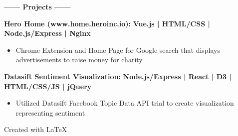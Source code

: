 \documentclass[12pt]{article}
\begin{document}
\colorbox{secondary}{
    \parbox{45em}{
    \color{white}
    \begin{center}
    \textbf{\Large------ Projects ------}\\
    \end{center}
    \begin{footnotesize}

    \textbf{\color{primary}\large Hero Home (www.home.heroinc.io):} \hfill \textbf{\color{Cerulean}Vue.js | HTML/CSS | Node.js/Express | Nginx }
    \begin{itemize}
        \item Chrome Extension and Home Page for Google search that displays advertisements to raise money for charity
    \end{itemize}


    \flushleft

    \textbf{\color{primary}\large Datasift Sentiment Visualization:} \hfill \textbf{\color{Cerulean} Node.js/Express | React | D3 | HTML/CSS/JS | jQuery}
    \begin{itemize}
        \item Utilized Datasift Facebook Topic Data API trial to create visualization representing sentiment 
    \end{itemize}

    \end{footnotesize}
}}

\center
Created with \LaTeX
\end{document}
